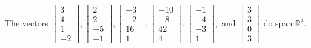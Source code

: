 \begin{exercise}
\begin{exerciseStatement}
  \end{exerciseStatement}
  \begin{exerciseAnswer}
   The vectors \(\left[\begin{array}{r}
3 \\
4 \\
1 \\
-2
\end{array}\right] , \left[\begin{array}{r}
2 \\
2 \\
-5 \\
-1
\end{array}\right] , \left[\begin{array}{r}
-3 \\
-2 \\
16 \\
1
\end{array}\right] , \left[\begin{array}{r}
-10 \\
-8 \\
42 \\
4
\end{array}\right] , \left[\begin{array}{r}
-1 \\
-4 \\
-3 \\
1
\end{array}\right] , \text{ and } \left[\begin{array}{r}
3 \\
3 \\
0 \\
3
\end{array}\right]\) 
  	 do  
	span \(\mathbb{R}^4\).
  


  \end{exerciseAnswer}
\end{exercise}